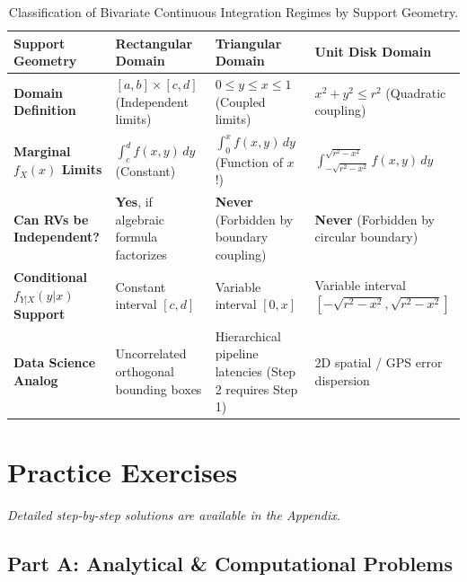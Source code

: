 \begin{table}[htbp]
\centering
\small
\begin{tabular}{p{3.2cm}p{3.8cm}p{3.8cm}p{3.5cm}}
\toprule
\textbf{Support Geometry} & \textbf{Rectangular Domain} & \textbf{Triangular Domain} & \textbf{Unit Disk Domain} \\
\midrule
\textbf{Domain Definition} & $[a, b] \times [c, d]$ (Independent limits) & $0 \le y \le x \le 1$ (Coupled limits) & $x^2 + y^2 \le r^2$ (Quadratic coupling) \\
\addlinespace
\textbf{Marginal $f_X(x)$ Limits} & $\int_c^d f(x, y) \, dy$ (Constant) & $\int_0^x f(x, y) \, dy$ (Function of $x$!) & $\int_{-\sqrt{r^2-x^2}}^{\sqrt{r^2-x^2}} f(x, y) \, dy$ \\
\addlinespace
\textbf{Can RVs be Independent?} & \textbf{Yes}, if algebraic formula factorizes & \textbf{Never} (Forbidden by boundary coupling) & \textbf{Never} (Forbidden by circular boundary) \\
\addlinespace
\textbf{Conditional $f_{Y|X}(y|x)$ Support} & Constant interval $[c, d]$ & Variable interval $[0, x]$ & Variable interval $[-\sqrt{r^2-x^2}, \sqrt{r^2-x^2}]$ \\
\addlinespace
\textbf{Data Science Analog} & Uncorrelated orthogonal bounding boxes & Hierarchical pipeline latencies (Step 2 requires Step 1) & 2D spatial / GPS error dispersion \\
\bottomrule
\end{tabular}
\caption{Classification of Bivariate Continuous Integration Regimes by Support Geometry.}
\end{table}

\newpage
\section{Practice Exercises}
\textit{Detailed step-by-step solutions are available in the Appendix.}

\subsection*{Part A: Analytical \& Computational Problems}

